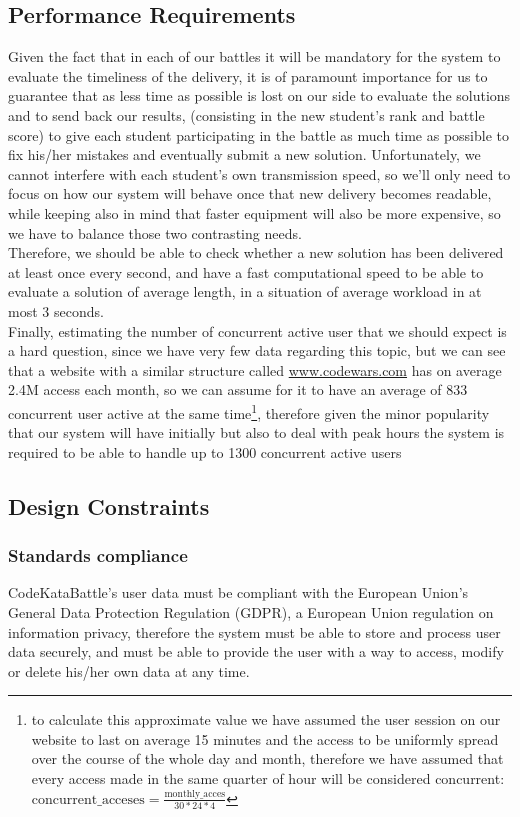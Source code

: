 \documentclass[../RASD.tex]{subfiles}
\begin{document}
    \subsection{Performance Requirements}
        Given the fact that in each of our battles it will be mandatory for the system to evaluate the timeliness of the delivery, it is of paramount importance for us to guarantee that as less time as possible is lost on our side to evaluate the solutions and to send back our results, (consisting in the new student's rank and battle score) to give each student participating in the battle as much time as possible to fix his/her mistakes and eventually submit a new solution. Unfortunately, we cannot interfere with each student's own transmission speed, so we'll only need to focus on how our system will behave once that new delivery becomes readable, while keeping also in mind that faster equipment will also be more expensive, so we have to balance those two contrasting needs.\\
        Therefore, we should be able to check whether a new solution has been delivered at least once every second, and have a fast computational speed to be able to evaluate a solution of average length, in a situation of average workload in at most 3 seconds.\\
        Finally, estimating the number of concurrent active user that we should expect is a hard question, since we have very few data regarding this topic, but we can see that a website with a similar structure called \url{www.codewars.com} has on average 2.4M access each month\cite{CodeWars data}, so we can assume for it to have an average of 833 concurrent user active at the same time\footnote{to calculate this approximate value we have assumed the user session on our website to last on average 15 minutes and the access to be uniformly spread over the course of the whole day and month, therefore we have assumed that every access made in the same quarter of hour will be considered concurrent: $\text{concurrent\_acceses} = \frac{\text{monthly\_acces}}{30*24*4}$}, therefore given the minor popularity that our system will have initially but also to deal with peak hours the system is required to be able to handle up to 1300 concurrent active users\newpage

    \subsection{Design Constraints}
        \subsubsection{Standards compliance}    
            CodeKataBattle's user data must be compliant with the European Union's General Data Protection Regulation (GDPR), a European Union regulation on information privacy, therefore the system must be able to store and process user data securely, and must be able to provide the user with a way to access, modify or delete his/her own data at any time.
    
\end{document}
